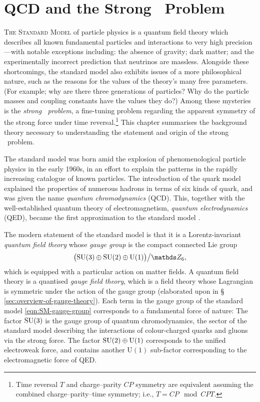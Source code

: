 \chapter{QCD and the Strong \CP\ Problem}

\textsc{The Standard Model} of particle physics is a quantum field theory which describes all known fundamental particles and interactions to very high precision---with notable exceptions including:
the absence of gravity;
dark matter;
and the experimentally incorrect prediction that neutrinos are massless.
Alongside these shortcomings, the standard model also exhibits issues of a more philosophical nature, such as the reasons for the values of the theory's many free parameters. (For example; why are there three generations of particles? Why do the particle masses and coupling constants have the values they do?)
Among these mysteries is the \emph{strong \CP\ problem}, a fine-tuning problem regarding the apparent symmetry of the strong force under time reversal.\footnote{Time reversal $T$ and charge--parity $CP$ symmetry are equivalent assuming the combined charge--parity--time symmetry; i.e., $T = CP \mod CPT$.}
This chapter summarises the background theory necessary to understanding the statement and origin of the strong \CP\ problem.

The standard model was born amid the explosion of phenomenological particle physics in the early 1960s, in an effort to explain the patterns in the rapidly increasing catalogue of known particles.
The introduction of the quark model explained the properties of numerous hadrons in terms of six kinds of quark, and was given the name \emph{quantum chromodynamics} (QCD). This, together with the well-established quantum theory of electromagnetism, \emph{quantum electrodynamics} (QED), became the first approximation to the standard model \cite{Weinberg_2004-history}.

The modern statement of the standard model is that it is a Lorentz-invariant \emph{quantum field theory} whose \emph{gauge group} is the compact connected Lie group
\begin{align}
	\qty\big(\SU(3)\oplus\SU(2)\oplus\mathrm{U}(1))\big/\ZZ_6
	\label{eqn:SM-gauge-group}
,\end{align}
which is equipped with a particular action on matter fields.
A quantum field theory is a quantised \emph{gauge field theory}, which is a field theory whose Lagrangian is symmetric under the action of the gauge group (elaborated upon in §\,\ref{sec:overview-of-gauge-theory}).
Each term in the gauge group of the standard model \eqref{eqn:SM-gauge-group} corresponds to a fundamental force of nature:
The factor $\mathrm{SU}(3)$ is the gauge group of quantum chromodynamics, the sector of the standard model describing the interactions of colour-charged quarks and gluons via the strong force.
The factor $\mathrm{SU}(2)\oplus\mathrm{U}(1)$ corresponds to the unified electroweak force, and contains another $\mathrm{U}(1)$ sub-factor corresponding to the electromagnetic force of QED.

